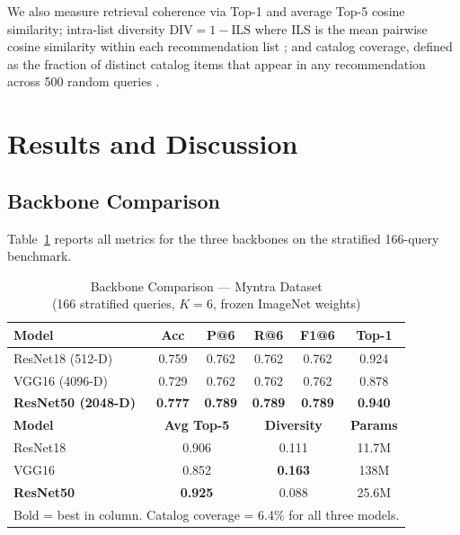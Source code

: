 \documentclass[conference]{IEEEtran}
\begin{document}
We also measure retrieval coherence via Top-1 and average Top-5 cosine
similarity; intra-list diversity
$\text{DIV} = 1 - \text{ILS}$ where ILS is the mean pairwise cosine
similarity within each recommendation list
\cite{ziegler2005diversification}; and catalog coverage, defined as the
fraction of distinct catalog items that appear in any recommendation
across 500 random queries \cite{ge2010beyond}.


\section{Results and Discussion}
\label{sec:results}

\subsection{Backbone Comparison}

Table~\ref{tab:comparison} reports all metrics for the three backbones
on the stratified 166-query benchmark.

\begin{table}[!t]
\caption{Backbone Comparison --- Myntra Dataset\\
(166 stratified queries, $K{=}6$, frozen ImageNet weights)}
\label{tab:comparison}
\centering
\renewcommand{\arraystretch}{1.2}
\begin{tabular}{lccccc}
\toprule
\textbf{Model} & \textbf{Acc} & \textbf{P@6} & \textbf{R@6} &
\textbf{F1@6} & \textbf{Top-1} \\
\midrule
ResNet18 (512-D)   & 0.759 & 0.762 & 0.762 & 0.762 & 0.924 \\
VGG16 (4096-D)     & 0.729 & 0.762 & 0.762 & 0.762 & 0.878 \\
\textbf{ResNet50 (2048-D)} &
\textbf{0.777} & \textbf{0.789} & \textbf{0.789} &
\textbf{0.789} & \textbf{0.940} \\
\midrule
\textbf{Model} & \multicolumn{2}{c}{\textbf{Avg Top-5}} &
\multicolumn{2}{c}{\textbf{Diversity}} & \textbf{Params} \\
\midrule
ResNet18   & \multicolumn{2}{c}{0.906} & \multicolumn{2}{c}{0.111} & 11.7M \\
VGG16      & \multicolumn{2}{c}{0.852} & \multicolumn{2}{c}{\textbf{0.163}} & 138M \\
\textbf{ResNet50} & \multicolumn{2}{c}{\textbf{0.925}} &
\multicolumn{2}{c}{0.088} & 25.6M \\
\bottomrule
\multicolumn{6}{l}{\small Bold = best in column. Catalog coverage = 6.4\% for all three models.}
\end{tabular}
\end{table}
\end{document}
